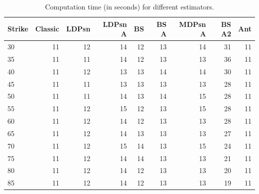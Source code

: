 \small{
\begin{table}[hbt!]
\centering
\begin{tabular}{lrrrrrrrr}
\toprule
Strike &  Classic &  LDPsn &  LDPsn A &  BS &  BS A &  MDPsn A &  BS A2 &  Ant \\
\midrule
30 &       11 &     12 &       14 &  12 &    13 &           14  &     31 &   11 \\
35 &       11 &     11 &       14 &  12 &    13 &           13  &     36 &   11 \\
40 &       11 &     12 &       13 &  13 &    14 &           14  &     30 &   11 \\
45 &       11 &     11 &       13 &  13 &    13 &           13  &     28 &   11 \\
50 &       11 &     11 &       14 &  13 &    14 &           15  &     28 &   11 \\
55 &       11 &     12 &       15 &  12 &    13 &           15  &     28 &   11 \\
60 &       11 &     12 &       14 &  12 &    13 &           13  &     28 &   11 \\
65 &       11 &     12 &       14 &  13 &    13 &           13  &     27 &   11 \\
70 &       11 &     12 &       15 &  14 &    13 &           15  &     24 &   11 \\
75 &       11 &     12 &       14 &  14 &    13 &           13  &     21 &   11 \\
80 &       11 &     12 &       14 &  12 &    13 &           13  &     20 &   11 \\
85 &       11 &     12 &       14 &  12 &    13 &           13  &     19 &   11 \\
\bottomrule
\end{tabular}
\bigskip
\caption{Computation time (in seconds) for different estimators.}\label{tab:CompTime}
\end{table}
}

